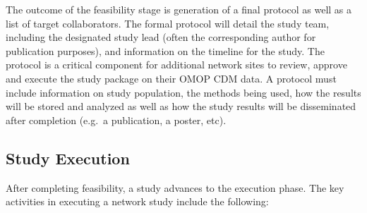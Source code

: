 \documentclass[11pt]{book}
\theoremstyle{definition}
\theoremstyle{definition}
\theoremstyle{definition}
\theoremstyle{remark}
\begin{document}
The outcome of the feasibility stage is generation of a final protocol as well as a list of target collaborators. The formal protocol will detail the study team, including the designated study lead (often the corresponding author for publication purposes), and information on the timeline for the study. The protocol is a critical component for additional network sites to review, approve and execute the study package on their OMOP CDM data. A protocol must include information on study population, the methods being used, how the results will be stored and analyzed as well as how the study results will be disseminated after completion (e.g.~a publication, a poster, etc).

\hypertarget{study-execution}{%
\subsection{Study Execution}\label{study-execution}}

After completing feasibility, a study advances to the execution phase. The key activities in executing a network study include the following:
\end{document}
